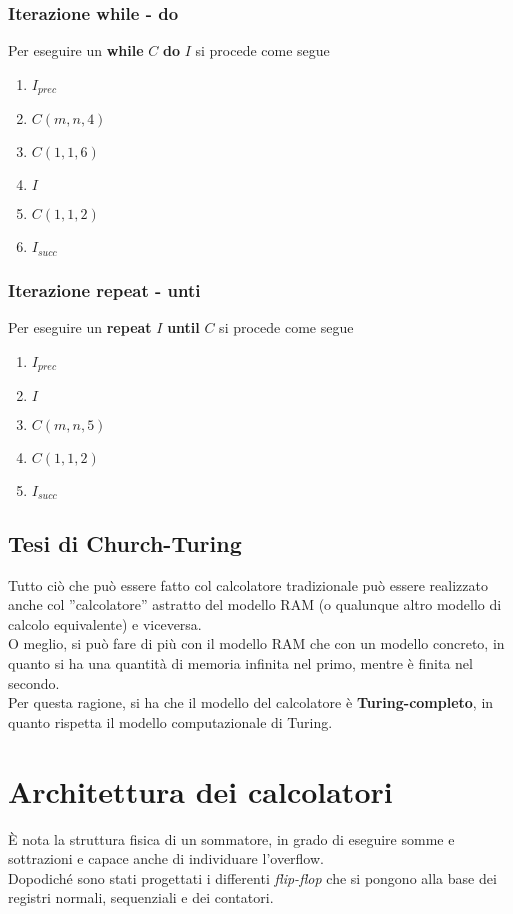 \documentclass[a4paper]{extarticle}
\newcommand{\quotes}[1]{''#1''}
\begin{document}
\vspace{1em}
\subsubsection{Iterazione while - do}
Per eseguire un \textbf{while} \(C\) \textbf{do} \(I\) si procede come segue
\begin{enumerate}
    \item \(I_{\textit{prec}}\)
    \item \(C(m, n, 4)\)
    \item \(C(1, 1, 6)\)
    \item \(I\)
    \item \(C(1, 1, 2)\)
    \item \(I_{\textit{succ}}\)
\end{enumerate}

\vspace{1em}
\subsubsection{Iterazione repeat - unti}
Per eseguire un \textbf{repeat} \(I\) \textbf{until} \(C\) si procede come segue
\begin{enumerate}
    \item \(I_{\textit{prec}}\)
    \item \(I\)
    \item \(C(m, n, 5)\)
    \item \(C(1, 1, 2)\)
    \item \(I_{\textit{succ}}\)
\end{enumerate}

\subsection{Tesi di Church-Turing}
Tutto ciò che può essere fatto col calcolatore tradizionale può essere realizzato anche col \quotes{calcolatore} astratto del modello RAM (o qualunque altro modello di calcolo equivalente) e viceversa.\\
O meglio, si può fare di più con il modello RAM che con un modello concreto, in quanto si ha una quantità di memoria infinita nel primo, mentre è finita nel secondo.\\
Per questa ragione, si ha che il modello del calcolatore è \textbf{Turing-completo}, in quanto rispetta il modello computazionale di Turing.

\newpage
\section{Architettura dei calcolatori}
È nota la struttura fisica di un sommatore, in grado di eseguire somme e sottrazioni e capace anche di individuare l'overflow.\\
Dopodiché sono stati progettati i differenti \textit{flip-flop} che si pongono alla base dei registri normali, sequenziali e dei contatori.
\end{document}
